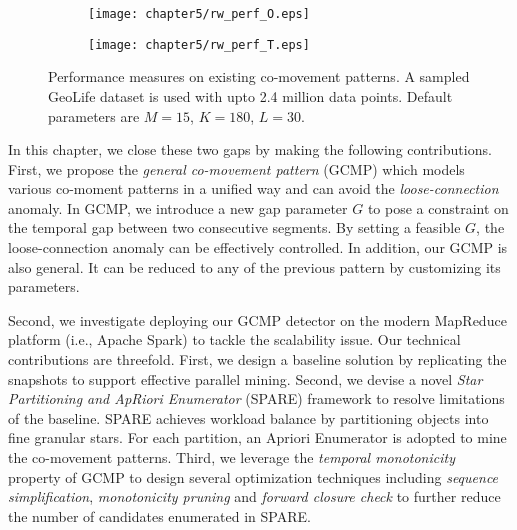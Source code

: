 \begin{figure}[h]
    \centering
    \begin{subfigure}[b]{0.45\textwidth}
            \centering
            \texttt{[image: chapter5/rw\_perf\_O.eps]}
    \label{fig:fig1}
    \end{subfigure}
    \begin{subfigure}[b]{0.45\textwidth}
            \centering
            \texttt{[image: chapter5/rw\_perf\_T.eps]}
    \label{fig:fig2}
    \end{subfigure}
    \caption{Performance measures on existing co-movement patterns. A sampled GeoLife dataset
    is used with upto 2.4 million data points. Default parameters are $M=15$, $K=180$, $L=30$.}
    \label{fig:related_work_scalability}
\end{figure}
%
%
%
In this chapter, we close these two gaps by making the following contributions.
First, we propose the \emph{general co-movement pattern} (GCMP) which models
various co-moment patterns in a unified way and can avoid 
the \emph{loose-connection} anomaly. In GCMP,
we introduce a new gap parameter $G$ to pose a constraint on the temporal gap between two consecutive segments. 
By setting a feasible $G$, the loose-connection anomaly can be effectively controlled. In addition, our GCMP is also general. It can be reduced to any of the previous pattern by customizing its parameters.

Second, we investigate deploying our GCMP detector on the modern MapReduce platform (i.e., Apache Spark) to tackle the scalability issue. Our technical contributions are threefold. First, we design a baseline solution by replicating the snapshots 
to support effective parallel mining. 
Second, we devise a novel \emph{Star Partitioning and ApRiori Enumerator} (SPARE) framework to resolve limitations of the baseline. 
SPARE achieves workload balance by partitioning objects into fine granular stars. 
For each partition, an Apriori Enumerator is adopted to mine the co-movement patterns. 
Third, we leverage the \emph{temporal monotonicity} property of GCMP 
to design several optimization techniques including \emph{sequence simplification}, \emph{monotonicity pruning} and \emph{forward closure check} to further reduce the number of candidates enumerated in SPARE.

